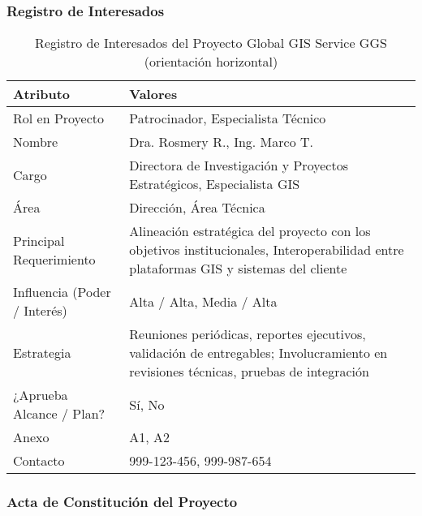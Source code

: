 \subsubsection{Registro de Interesados}

\begin{table}[H]
\centering
\renewcommand{\arraystretch}{1.3}
\begin{tabular}{|p{4cm}|p{10cm}|}
\hline
\textbf{Atributo} & \textbf{Valores} \\
\hline
Rol en Proyecto & Patrocinador, Especialista Técnico \\
\hline
Nombre & Dra. Rosmery R., Ing. Marco T. \\
\hline
Cargo & Directora de Investigación y Proyectos Estratégicos, Especialista GIS \\
\hline
Área & Dirección, Área Técnica \\
\hline
Principal Requerimiento & Alineación estratégica del proyecto con los objetivos institucionales, Interoperabilidad entre plataformas GIS y sistemas del cliente \\
\hline
Influencia (Poder / Interés) & Alta / Alta, Media / Alta \\
\hline
Estrategia & Reuniones periódicas, reportes ejecutivos, validación de entregables; Involucramiento en revisiones técnicas, pruebas de integración \\
\hline
¿Aprueba Alcance / Plan? & Sí, No \\
\hline
Anexo & A1, A2 \\
\hline
Contacto & 999-123-456, 999-987-654 \\
\hline
\end{tabular}
\caption{Registro de Interesados del Proyecto Global GIS Service GGS (orientación horizontal)}
\end{table}

\subsubsection{Acta de Constitución del Proyecto}

